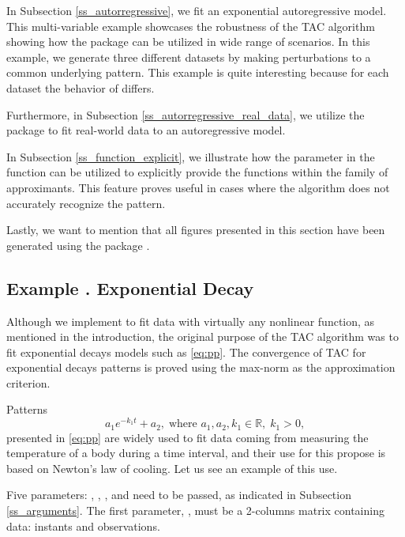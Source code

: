 In Subsection \ref{ss_autorregressive}, we fit an exponential autoregressive model. This multi-variable example showcases the robustness of the TAC algorithm showing how the  package can be utilized in wide range of scenarios. In this example, we generate three different datasets by making perturbations to a common underlying pattern. This example is quite interesting because for each dataset the behavior of  differs.

Furthermore, in Subsection \ref{ss_autorregressive_real_data}, we utilize the  package to fit real-world data to an autoregressive model.

In Subsection \ref{ss_function_explicit}, we illustrate how the  parameter in the  function can be  utilized to explicitly provide the functions within the family of approximants. This feature proves useful in cases where the algorithm does not accurately recognize the pattern.

Lastly, we want to mention that all figures presented in this section have been generated using the  package \citep{package_ggplot2}.










\addtocounter{n}{1}
\subsection{Example . Exponential Decay} \label{ss_one_exp}
Although we implement  to fit data with virtually any nonlinear function, as mentioned in the introduction, the original purpose of the TAC algorithm was to fit exponential decays models such as \eqref{eq:pp}. The convergence of TAC for exponential decays patterns is proved using the max-norm as the approximation criterion. 

Patterns
\begin{equation*}
a_1 e^{-k_1t} + a_2, \; \text{where } a_1,a_2,k_1 \in \mathbb{R}, \; k_1>0,
\end{equation*}
presented in \eqref{eq:pp} are widely used to fit data coming from measuring the temperature of a body during a time interval, and their use for this propose is based on Newton’s law of cooling. Let us see an example of this use. 

Five parameters: , , ,  and  need to be passed, as indicated in Subsection \ref{ss_arguments}. The first parameter, , must be a 2-columns matrix containing data: instants and observations.

